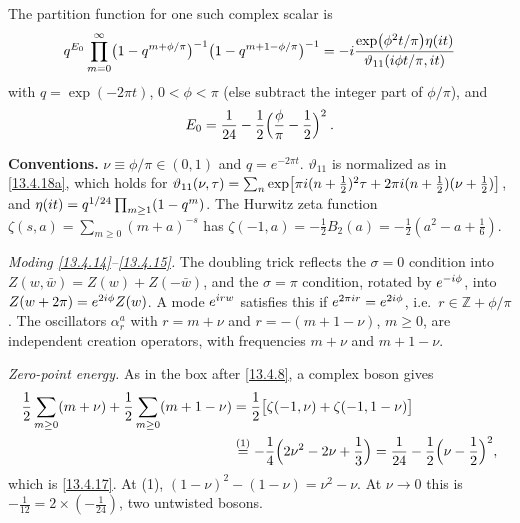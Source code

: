 The partition function for one such complex scalar is
\begin{equation}
	q^{E_0}\prod_{m=0}^\infty \bigl(1 - q^{m+\phi/\pi}\bigr)^{-1}\bigl(1 - q^{m+1-\phi/\pi}\bigr)^{-1} = -i\frac{\exp(\phi^2 t/\pi)\eta(i t)}{\vartheta_{11}(i\phi t/\pi, i t)} \label{13.4.16}
\end{equation}
with $q = \exp(-2\pi t)$, $0 < \phi < \pi$ (else subtract the integer part of $\phi/\pi$), and
\begin{equation}
	E_0 = \frac{1}{24} - \frac{1}{2}\Bigl(\frac{\phi}{\pi} - \frac{1}{2}\Bigr)^2 \:. \label{13.4.17}
\end{equation}
\begin{tcolorbox}[breakable]
	\begin{remark}
		\textbf{Conventions.} $\nu\equiv\phi/\pi\in(0,1)$ and $q=e^{-2\pi t}$. $\vartheta_{11}$ is normalized as in \eqref{13.4.18a}, which holds for $\vartheta_{11}(\nu,\tau)=\sum_n\exp[\pi i(n+\frac12)^2\tau+2\pi i(n+\frac12)(\nu+\frac12)]$, and $\eta(i t)=q^{1/24}\prod_{m\ge1}(1-q^m)$. The Hurwitz zeta function $\zeta(s,a)=\sum_{m\ge0}(m+a)^{-s}$ has $\zeta(-1,a)=-\frac12B_2(a)=-\frac12(a^2-a+\frac16)$.

		\textit{Moding \eqref{13.4.14}--\eqref{13.4.15}.} The doubling trick reflects the $\sigma=0$ condition into $Z(w,\bar w)=Z(w)+Z(-\bar w)$, and the $\sigma=\pi$ condition, rotated by $e^{-i\phi}$, into $Z(w+2\pi)=e^{2i\phi}Z(w)$. A mode $e^{i rw}$ satisfies this if $e^{2\pi i r}=e^{2i\phi}$, i.e.\ $r\in\mathbb Z+\phi/\pi$. The oscillators $\alpha^a_r$ with $r=m+\nu$ and $r=-(m+1-\nu)$, $m\ge0$, are independent creation operators, with frequencies $m+\nu$ and $m+1-\nu$.

		\textit{Zero-point energy.} As in the box after \eqref{13.4.8}, a complex boson gives
		\begin{align*}
			\frac12\sum_{m\ge0}(m+\nu)+\frac12\sum_{m\ge0}(m+1-\nu) &= \frac12\bigl[\zeta(-1,\nu)+\zeta(-1,1-\nu)\bigr]\\
			&\overset{(1)}{=} -\frac14\Bigl(2\nu^2-2\nu+\frac13\Bigr) = \frac1{24}-\frac12\Bigl(\nu-\frac12\Bigr)^2 ,
		\end{align*}
		which is \eqref{13.4.17}. At (1), $(1-\nu)^2-(1-\nu)=\nu^2-\nu$. At $\nu\to0$ this is $-\frac1{12}=2\times(-\frac1{24})$, two untwisted bosons.


\end{remark}
\end{tcolorbox}
